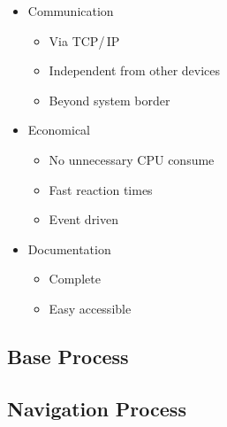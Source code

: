 \begin{itemize}
\itemsep0em
\item Communication
	\begin{itemize}
	\item Via TCP/\,IP
	\item Independent from other devices
	\item Beyond system border
	\end{itemize}
	
\item Economical
	\begin{itemize}
	\item No unnecessary CPU consume
	\item Fast reaction times
	\item Event driven
	\end{itemize}
	
\item Documentation
	\begin{itemize}
	\item Complete
	\item Easy accessible
	\end{itemize}
\end{itemize}

\subsection{Base Process}

\subsection{Navigation Process}


